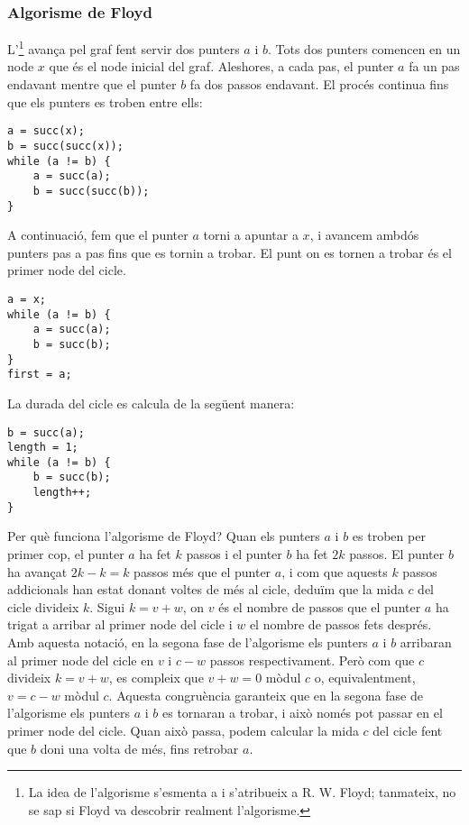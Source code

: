 \subsubsection{Algorisme de Floyd}


L'\footnote{La idea de l'algorisme s'esmenta a
\cite{knu982} i s'atribueix a R. W. Floyd; tanmateix, no se sap si
Floyd va descobrir realment l'algorisme.} avança pel graf fent servir
dos punters $a$ i $b$. Tots dos punters comencen en un node $x$ que és
el node inicial del graf. Aleshores, a cada pas, el punter $a$ fa un
pas endavant mentre que el punter $b$ fa dos passos endavant. El
procés continua fins que els punters es troben entre ells:
\begin{lstlisting}
a = succ(x);
b = succ(succ(x));
while (a != b) {
    a = succ(a);
    b = succ(succ(b));
}
\end{lstlisting}

A continuació, fem que el punter $a$ torni a apuntar a $x$, i avancem ambdós
punters pas a pas fins que es tornin a trobar. El punt on es tornen a trobar
és el primer node del cicle.
\begin{lstlisting}
a = x;
while (a != b) {
    a = succ(a);
    b = succ(b);
}
first = a;
\end{lstlisting}

La durada del cicle es calcula de la següent manera:
\begin{lstlisting}
b = succ(a);
length = 1;
while (a != b) {
    b = succ(b);
    length++;
}
\end{lstlisting}

Per què funciona l'algorisme de Floyd? Quan els punters $a$ i $b$ es
troben per primer cop, el punter $a$ ha fet $k$ passos i el punter $b$
ha fet $2k$ passos. El punter $b$ ha avançat $2k-k=k$ passos més que
el punter $a$, i com que aquests $k$ passos addicionals han estat
donant voltes de més al cicle, deduïm que la mida $c$ del cicle
divideix $k$. Sigui $k=v+w$, on $v$ és el nombre de passos que el
punter $a$ ha trigat a arribar al primer node del cicle i $w$ el
nombre de passos fets després. Amb aquesta notació, en la segona fase
de l'algorisme els punters $a$ i $b$ arribaran al primer node del
cicle en $v$ i $c-w$ passos respectivament. Però com que $c$ divideix
$k=v+w$, es compleix que $v+w=0$ mòdul $c$ o, equivalentment, $v =
c-w$ mòdul $c$. Aquesta congruència garanteix que en la segona fase de
l'algorisme els punters $a$ i $b$ es tornaran a trobar, i això només
pot passar en el primer node del cicle. Quan això passa, podem
calcular la mida $c$ del cicle fent que $b$ doni una volta de més,
fins retrobar $a$.

